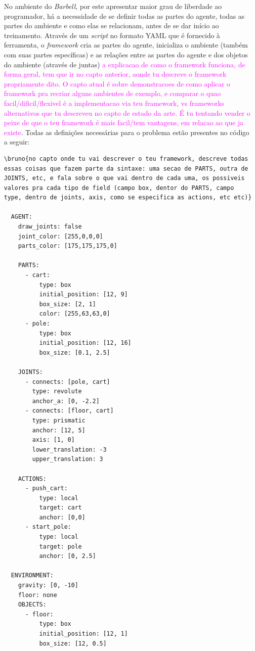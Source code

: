 \documentclass[cic,tc]{iiufrgs}
\newcommand\bruno[1]{\textcolor{magenta}{#1}}
\begin{document}
No ambiente do \textit{Barbell}, por este apresentar maior grau de liberdade ao programador, há a necessidade de se
definir todas as partes do agente, todas as partes do ambiente e como elas se relacionam, antes de se dar início ao
treinamento. Através de um \textit{script} no formato YAML que é fornecido à ferramenta, o \textit{framework} cria
as partes do agente, inicializa o ambiente (também com suas partes específicas) e as relações entre as partes do agente e
dos objetos do ambiente (através de juntas) \bruno{a explicacao de como o framework funciona, de forma geral, tem que ir no capto anterior, aonde tu descreve o framework propriamente dito. O capto atual é sobre demonstracoes de como aplicar o framework pra recriar alguns ambientes de exemplo, e comparar o quao facil/dificil/flexivel é a implementacao via teu framework, vs frameworks alternativos que tu descreveu no capto de estado da arte. É tu tentando vender o peixe de que o teu framework é mais facil/tem vantagens, em relacao ao que ja existe}. Todas as definições necessárias para o problema estão presentes no código a seguir:

\begin{verbatim}
\bruno{no capto onde tu vai descrever o teu framework, descreve todas essas coisas que fazem parte da sintaxe: uma secao de PARTS, outra de JOINTS, etc, e fala sobre o que vai dentro de cada uma, os possiveis valores pra cada tipo de field (campo box, dentor do PARTS, campo type, dentro de joints, axis, como se especifica as actions, etc etc)}

  AGENT:
    draw_joints: false
    joint_color: [255,0,0,0]
    parts_color: [175,175,175,0]

    PARTS:
      - cart:
          type: box
          initial_position: [12, 9]
          box_size: [2, 1]
          color: [255,63,63,0]
      - pole:
          type: box
          initial_position: [12, 16]
          box_size: [0.1, 2.5]

    JOINTS:
      - connects: [pole, cart]
        type: revolute
        anchor_a: [0, -2.2]
      - connects: [floor, cart]
        type: prismatic
        anchor: [12, 5]
        axis: [1, 0]
        lower_translation: -3
        upper_translation: 3

    ACTIONS:
      - push_cart:
          type: local
          target: cart
          anchor: [0,0]
      - start_pole:
          type: local
          target: pole
          anchor: [0, 2.5]

  ENVIRONMENT:
    gravity: [0, -10]
    floor: none
    OBJECTS:
      - floor:
          type: box
          initial_position: [12, 1]
          box_size: [12, 0.5]
\end{verbatim}
\end{document}
